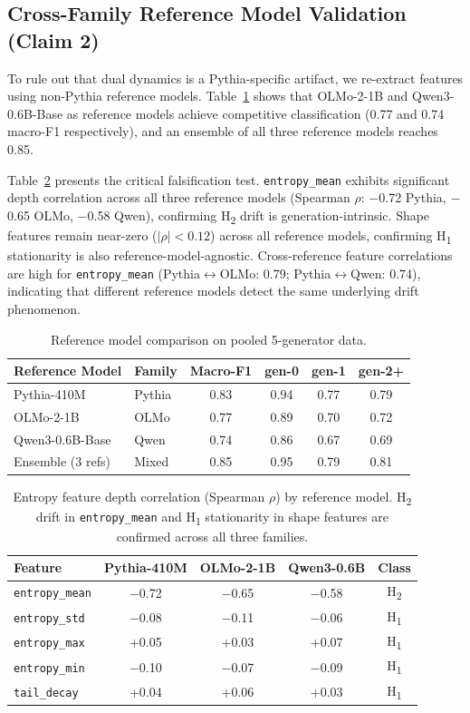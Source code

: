 \documentclass[letterpaper]{article}
\newcommand{\feat}[1]{\texttt{#1}}
\newcommand{\htwo}{H\textsubscript{2}}
\newcommand{\hone}{H\textsubscript{1}}
\begin{document}
\subsection{Cross-Family Reference Model Validation (Claim 2)}
\label{sec:crossref}

To rule out that dual dynamics is a Pythia-specific artifact, we re-extract features using non-Pythia reference models.
Table~\ref{tab:crossref} shows that OLMo-2-1B and Qwen3-0.6B-Base as reference models achieve competitive classification (0.77 and 0.74 macro-F1 respectively), and an ensemble of all three reference models reaches 0.85.

Table~\ref{tab:rho_ref} presents the critical falsification test.
\feat{entropy\_mean} exhibits significant depth correlation across all three reference models (Spearman $\rho$: $-$0.72 Pythia, $-$0.65 OLMo, $-$0.58 Qwen), confirming \htwo{} drift is generation-intrinsic.
Shape features remain near-zero ($|\rho| < 0.12$) across all reference models, confirming \hone{} stationarity is also reference-model-agnostic.
Cross-reference feature correlations are high for \feat{entropy\_mean} (Pythia$\leftrightarrow$OLMo: 0.79; Pythia$\leftrightarrow$Qwen: 0.74), indicating that different reference models detect the same underlying drift phenomenon.

\begin{table}[t]
\centering
\caption{Reference model comparison on pooled 5-generator data.}
\label{tab:crossref}
\begin{tabular}{llcccc}
\toprule
Reference Model & Family & Macro-F1 & gen-0 & gen-1 & gen-2+ \\
\midrule
Pythia-410M & Pythia & 0.83 & 0.94 & 0.77 & 0.79 \\
OLMo-2-1B & OLMo & 0.77 & 0.89 & 0.70 & 0.72 \\
Qwen3-0.6B-Base & Qwen & 0.74 & 0.86 & 0.67 & 0.69 \\
Ensemble (3 refs) & Mixed & 0.85 & 0.95 & 0.79 & 0.81 \\
\bottomrule
\end{tabular}
\end{table}

\begin{table}[t]
\centering
\caption{Entropy feature depth correlation (Spearman $\rho$) by reference model. \htwo{} drift in \feat{entropy\_mean} and \hone{} stationarity in shape features are confirmed across all three families.}
\label{tab:rho_ref}
\begin{tabular}{lcccc}
\toprule
Feature & Pythia-410M & OLMo-2-1B & Qwen3-0.6B & Class \\
\midrule
\feat{entropy\_mean} & $-$0.72 & $-$0.65 & $-$0.58 & \htwo{} \\
\feat{entropy\_std} & $-$0.08 & $-$0.11 & $-$0.06 & \hone{} \\
\feat{entropy\_max} & +0.05 & +0.03 & +0.07 & \hone{} \\
\feat{entropy\_min} & $-$0.10 & $-$0.07 & $-$0.09 & \hone{} \\
\feat{tail\_decay} & +0.04 & +0.06 & +0.03 & \hone{} \\
\bottomrule
\end{tabular}
\end{table}
\end{document}
